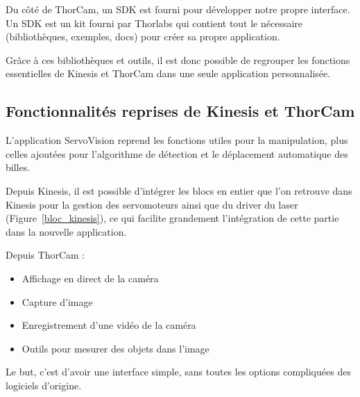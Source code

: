 Du côté de ThorCam, un SDK est fourni pour développer notre propre interface. Un SDK est un kit fourni par Thorlabs qui contient tout le nécessaire (bibliothèques, exemples, docs) pour créer sa propre application.

Grâce à ces bibliothèques et outils, il est donc possible de regrouper les fonctions essentielles de Kinesis et ThorCam dans une seule application personnalisée.

\subsection{Fonctionnalités reprises de Kinesis et ThorCam}

L'application ServoVision reprend les fonctions utiles pour la manipulation, plus celles ajoutées pour l'algorithme de détection et le déplacement automatique des billes.

Depuis Kinesis, il est possible d'intégrer les blocs en entier que l'on retrouve dans Kinesis pour la gestion des servomoteurs ainsi que du driver du laser (Figure~\ref{bloc_kinesis}), ce qui facilite grandement l'intégration de cette partie dans la nouvelle application.

Depuis ThorCam :
\begin{itemize}[label=\textbullet]
    \item Affichage en direct de la caméra
    \item Capture d'image
    \item Enregistrement d'une vidéo de la caméra
    \item Outils pour mesurer des objets dans l'image
\end{itemize}

Le but, c'est d'avoir une interface simple, sans toutes les options compliquées des logiciels d'origine.